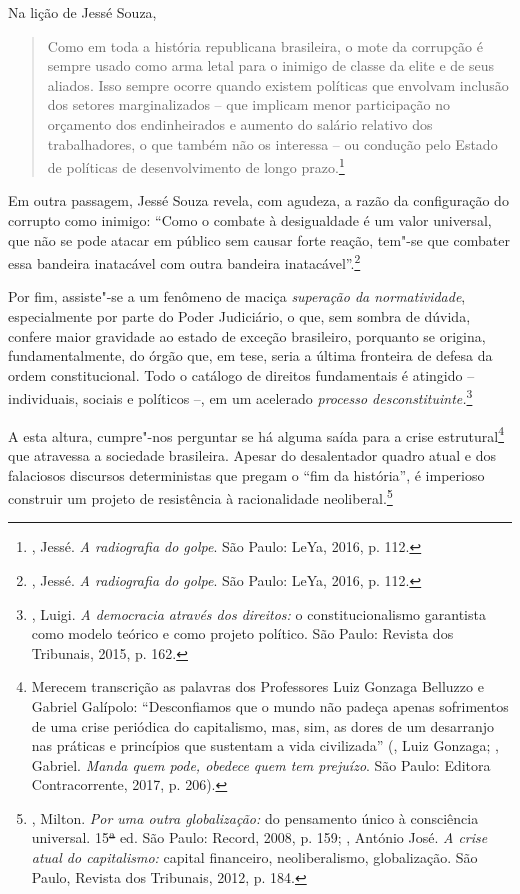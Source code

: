 Na lição de Jessé Souza,

\begin{quote}
Como em toda a história republicana brasileira, o mote da corrupção é
sempre usado como arma letal para o inimigo de classe da elite e de seus
aliados. Isso sempre ocorre quando existem políticas que envolvam
inclusão dos setores marginalizados -- que implicam menor participação
no orçamento dos endinheirados e aumento do salário relativo dos
trabalhadores, o que também não os interessa -- ou condução pelo Estado
de políticas de desenvolvimento de longo prazo.\footnote{, Jessé.
  \emph{A radiografia do golpe}. São Paulo: LeYa, 2016, p. 112.}
\end{quote}

Em outra passagem, Jessé Souza revela, com agudeza, a razão da
configuração do corrupto como inimigo: ``Como o combate à desigualdade é
um valor universal, que não se pode atacar em público sem causar forte
reação, tem"-se que combater essa bandeira inatacável com outra bandeira
inatacável''.\footnote{, Jessé. \emph{A radiografia do golpe}. São
  Paulo: LeYa, 2016, p. 112.}

Por fim, assiste"-se a um fenômeno de maciça \emph{superação da
normatividade}, especialmente por parte do Poder Judiciário, o que, sem
sombra de dúvida, confere maior gravidade ao estado de exceção
brasileiro, porquanto se origina, fundamentalmente, do órgão que, em
tese, seria a última fronteira de defesa da ordem constitucional. Todo o
catálogo de direitos fundamentais é atingido -- individuais, sociais e
políticos --, em um acelerado \emph{processo desconstituinte.}\footnote{,
  Luigi. \emph{A democracia através dos direitos:} o constitucionalismo
  garantista como modelo teórico e como projeto político. São Paulo:
  Revista dos Tribunais, 2015, p. 162.}

A esta altura, cumpre"-nos perguntar se há alguma saída para a crise
estrutural\footnote{Merecem transcrição as palavras dos Professores Luiz
  Gonzaga Belluzzo e Gabriel Galípolo: ``Desconfiamos que o mundo não
  padeça apenas sofrimentos de uma crise periódica do capitalismo, mas,
  sim, as dores de um desarranjo nas práticas e princípios que sustentam
  a vida civilizada'' (, Luiz Gonzaga; , Gabriel.
  \emph{Manda quem pode, obedece quem tem prejuízo}. São Paulo: Editora
  Contracorrente, 2017, p. 206).} que atravessa a sociedade brasileira.
Apesar do desalentador quadro atual e dos falaciosos discursos
deterministas que pregam o ``fim da história'', é imperioso construir um
projeto de resistência à racionalidade neoliberal.\footnote{,
  Milton. \emph{Por uma outra globalização:} do pensamento único à
  consciência universal. 15\sout{ª} ed. São Paulo: Record, 2008, p. 159;
  , António José. \emph{A crise atual do capitalismo:}
  capital financeiro, neoliberalismo, globalização. São Paulo, Revista
  dos Tribunais, 2012, p. 184.}

